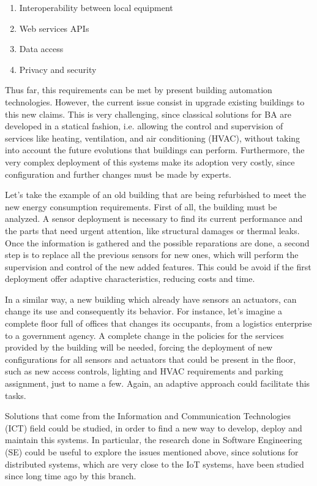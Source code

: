 \begin{enumerate}
	\item Interoperability between local equipment
	\item Web services APIs
	\item Data access
	\item Privacy and security
\end{enumerate}

Thus far, this requirements can be met by present building automation technologies.
However, the current issue consist in upgrade existing buildings to this new claims.
This is very challenging, since classical solutions for BA are developed in a statical fashion, i.e. allowing the control and supervision of services like heating, ventilation, and air conditioning (HVAC), without taking into account the future evolutions that buildings can perform.
Furthermore, the very complex deployment of this systems make its adoption very costly, since configuration and further changes must be made by experts.

Let's take the example of an old building that are being refurbished to meet the new energy consumption requirements.
First of all, the building must be analyzed.
A sensor deployment is necessary to find its current performance and the parts that need urgent attention, like structural damages or thermal leaks.
Once the information is gathered and the possible reparations are done, a second step is to replace all the previous sensors for new ones, which will perform the supervision and control of the new added features.
This could be avoid if the first deployment offer adaptive characteristics, reducing costs and time.

In a similar way, a new building which already have sensors an actuators, can change its use and consequently its behavior.
For instance, let's imagine a complete floor full of offices that changes its occupants, from a logistics enterprise to a government agency.
A complete change in the policies for the services provided by the building will be needed, forcing the deployment of new configurations for all sensors and actuators that could be present in the floor, such as new access controls, lighting and HVAC requirements and parking assignment, just to name a few.
Again, an adaptive approach could facilitate this tasks.

Solutions that come from the Information and Communication Technologies (ICT) field could be studied, in order to find a new way to develop, deploy and maintain this systems.
In particular, the research done in Software Engineering (SE) could be useful to explore the issues mentioned above, since solutions for distributed systems, which are very close to the IoT systems, have been studied since long time ago by this branch.

